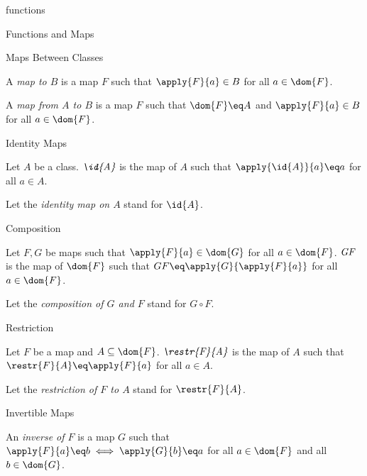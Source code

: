 \documentclass{naproche-library}
\begin{document}
\begin{smodule}{functions}
\begin{sfragment}{Functions and Maps}
\begin{sfragment}{Maps Between Classes}
    \begin{definition*}[forthel,id=MapToDef]
      A \emph{map to $B$} is a map $F$ such that $\apply{F}{a}\in B$ for all $a\in\dom{F}$.
    \end{definition*}

    \begin{definition*}[forthel,id=MapFromToDef]
      A \emph{map from $A$ to $B$} is a map $F$ such that $\dom{F}\eq A$ and $\apply{F}{a}\in B$ for all $a\in\dom{F}$.
    \end{definition*}
  \end{sfragment}

  \begin{sfragment}{Identity Maps}
    \begin{definition*}[forthel,id=IdentityMapDef]
      Let $A$ be a class.
      $\emph{\id{A}}$ is the map of $A$ such that $\apply{\id{A}}{a}\eq a$ for all $a\in A$.

      Let the \emph{identity map on $A$} stand for $\id{A}$.
    \end{definition*}
  \end{sfragment}

  \begin{sfragment}{Composition}
    \begin{definition*}[forthel,id=CompositionDef]
      Let $F,G$ be maps such that $\apply{F}{a}\in\dom{G}$ for all $a\in\dom{F}$.
      $\emph{G\circ F}$ is the map of $\dom{F}$ such that $G\circ F\eq\apply{G}{\apply{F}{a}}$ for all $a\in\dom{F}$.

      Let the \emph{composition of $G$ and $F$} stand for $G\circ F$.
    \end{definition*}
  \end{sfragment}

  \begin{sfragment}{Restriction}
    \begin{definition*}[forthel,id=RestrictionDef]
      Let $F$ be a map and $A\subseteq\dom{F}$.
      $\emph{\restr{F}{A}}$ is the map of $A$ such that $\restr{F}{A}\eq \apply{F}{a}$ for all $a\in A$.

      Let the \emph{restriction of $F$ to $A$} stand for $\restr{F}{A}$.
    \end{definition*}
  \end{sfragment}

  \begin{sfragment}{Invertible Maps}
    \begin{definition*}[forthel,id=InvertibleDef]
      An \emph{inverse of $F$} is a map $G$ such that $\apply{F}{a}\eq b\iff \apply{G}{b}\eq a$ for all $a\in\dom{F}$ and all $b\in\dom{G}$.


\end{definition*}
\end{sfragment}
\end{sfragment}
\end{smodule}
\end{document}

